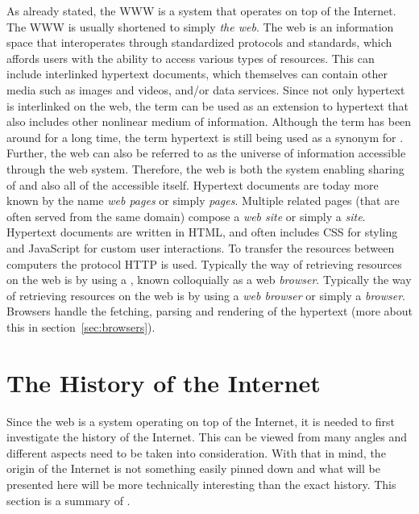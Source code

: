   As already stated, the \gls{WWW} is a system that operates on top of the Internet.
  The \gls{WWW} is usually shortened to simply \emph{the \gls{web}}.
  The \gls{web} is an information space that interoperates through standardized protocols and standards, which affords users with the ability to access various types of resources.
  This can include interlinked \gls{hypertext} \glspl{document}, which themselves can contain other media such as images and videos, and/or data services.
  Since not only \gls{hypertext} is interlinked on the \gls{web}, the term \emph{} can be used as an extension to \gls{hypertext} that also includes other nonlinear medium of information.
  Although the term  has been around for a long time, the term \gls{hypertext} is still being used as a synonym for .
  Further, the \gls{web} can also be referred to as the universe of information accessible through the \gls{web} system.
  Therefore, the \gls{web} is both the system enabling sharing of  and also all of the accessible  itself.
  Hypertext \glspl{document} are today more known by the name \emph{\gls{web} pages} or simply \emph{pages}.
  Multiple related pages (that are often served from the same domain) compose a \emph{web site} or simply a \emph{site}.
  Hypertext \glspl{document} are written in \gls{HTML}, and often includes \gls{CSS} for styling and \gls{JavaScript} for custom user interactions.
  To transfer the resources between computers the protocol \gls{HTTP} is used.
  Typically the way of retrieving resources on the web is by using a \emph{}, known colloquially as a \gls{web} \emph{\gls{browser}}.
  Typically the way of retrieving resources on the \gls{web} is by using a \emph{\gls{web} \gls{browser}} or simply a \emph{\gls{browser}}.
  Browsers handle the fetching, parsing and rendering of the \gls{hypertext} (more about this in section~\ref{sec:browsers}).
  
  \section{The History of the Internet}\label{sec:history-internet}
    Since the \gls{web} is a system operating on top of the Internet, it is needed to first investigate the history of the Internet.
    This can be viewed from many angles and different aspects need to be taken into consideration.
    With that in mind, the origin of the Internet is not something easily pinned down and what will be presented here will be more technically interesting than the exact history.
    This section is a summary of .

